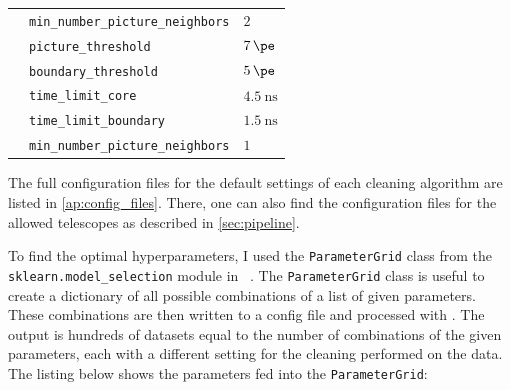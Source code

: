 \begin{table}
{\begin{tabular}{l l l}
                    & \texttt{min\_number\_picture\_neighbors}  & \qquad\(\num{2}\) \\
        \addlinespace[0.5em]
        \tcc{}      & \texttt{picture\_threshold}               & \qquad\(\SI{7}{\pe}\) \\
                    & \texttt{boundary\_threshold}              & \qquad\(\SI{5}{\pe}\) \\
                    & \texttt{time\_limit\_core}                & \qquad\(\SI{4.5}{\nano\second}\) \\
                    & \texttt{time\_limit\_boundary}            & \qquad\(\SI{1.5}{\nano\second}\) \\
                    & \texttt{min\_number\_picture\_neighbors}  & \qquad\(\num{1}\) \\
  \end{tabular}}
\end{table}
The full configuration files for the default settings of each cleaning algorithm are listed in
\autoref{ap:config_files}. There, one can also find the configuration files for the allowed telescopes
as described in \autoref{sec:pipeline}.

To find the optimal hyperparameters, I used the \texttt{ParameterGrid} class from the
\texttt{sklearn.model\_selection} module in \sklearn{}~\cite{scikit-learn}. The \texttt{ParameterGrid} class is useful to create a
dictionary of all possible combinations of a list of given parameters. These combinations are then
written to a config file and processed with \ctapipe{}. The output is hundreds of datasets equal to
the number of combinations of the given parameters, each with a different setting for the cleaning
performed on the data. The listing below shows the parameters fed into the \texttt{ParameterGrid}:
\begin{mdframed}[backgroundcolor=white!20!black,leftmargin=0cm,rightmargin=0cm, skipabove=0pt, innerleftmargin=0,innerrightmargin=0,]
\end{mdframed}

